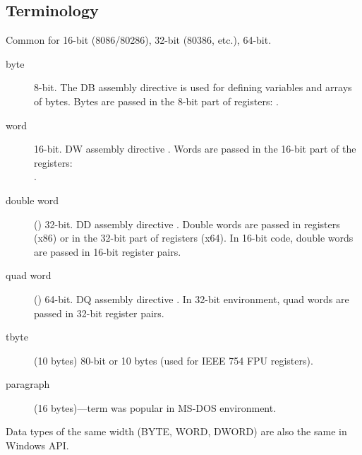 
\subsection{Terminology}

Common for 16-bit (8086/80286), 32-bit (80386, etc.), 64-bit.

\begin{description}
	\item[byte] 8-bit.
		The DB assembly directive is used for defining variables and arrays of bytes.
		Bytes are passed in the 8-bit part of registers: .
	\item[word] 16-bit. 
		DW assembly directive \dittoclosing.
		Words are passed in the 16-bit part of the registers:\\
			.
	\item[double word] () 32-bit.
		DD assembly directive \dittoclosing.
		Double words are passed in registers (x86) or in the 32-bit part of registers (x64). 
		In 16-bit code, double words are passed in 16-bit register pairs.
	\item[quad word] () 64-bit.
		DQ assembly directive \dittoclosing.
		In 32-bit environment, quad words are passed in 32-bit register pairs.
	\item[tbyte] (10 bytes) 80-bit or 10 bytes (used for IEEE 754 FPU registers).
	\item[paragraph] (16 bytes)---term was popular in MS-DOS environment. %
\end{description}


Data types of the same width (BYTE, WORD, DWORD) are also the same in Windows \ac{API}.



